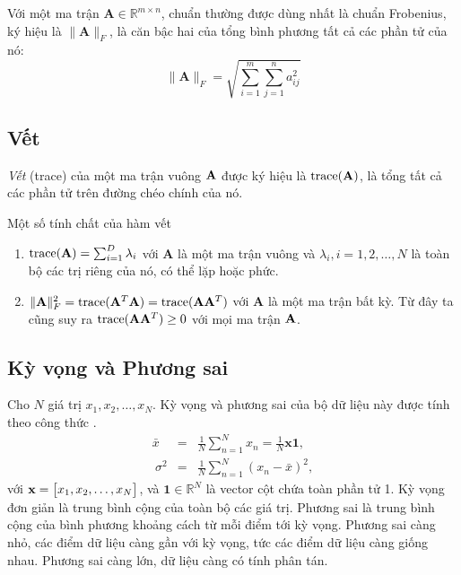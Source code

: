 Với một ma trận $\mathbf{A} \in \mathbb{R}^{m\times n}$, chuẩn thường được dùng
nhất là chuẩn Frobenius, ký hiệu là $\|\mathbf{A}\|_F$, là căn bậc hai của tổng
bình phương tất cả các phần tử của nó:
\begin{equation*}
\|\mathbf{A}\|_F = \sqrt{\sum_{i = 1}^m \sum_{j = 1}^n a_{ij}^2}
\end{equation*}
\subsection{Vết}
\textit{Vết} (trace) của một ma trận vuông $\mathbf{A}$ được ký hiệu là $\text{trace}(\mathbf{A})$, là tổng
tất cả các phần tử trên đường chéo chính của nó.

 Một số tính chất của hàm vết
\begin{enumerate}

	\item $\text{trace}(\mathbf{A}) = \sum_{i = 1}^D \lambda_i $ với
	$\mathbf{A}$ là một ma trận vuông và $\lambda_i, i = 1, 2, \dots, N$ là toàn
	bộ các trị riêng của nó, có thể lặp hoặc phức. 

	\item $\|\mathbf{A}\|_F^2 = \text{trace}(\mathbf{A}^T\mathbf{A}) =
	\text{trace}(\mathbf{A}\mathbf{A}^T)$ với $\mathbf{A}$ là một ma trận bất kỳ. Từ
	đây ta cũng suy ra $\text{trace}(\mathbf{A}\mathbf{A}^T) \geq 0$ với mọi ma trận $\mathbf{A}$.
	
\end{enumerate}
\subsection{Kỳ vọng và Phương sai} %

Cho $N$ giá trị $x_1, x_2, \dots, x_N$. {Kỳ vọng} và {phương sai}
của bộ dữ liệu này được tính theo công thức \cite{V1}.
\begin{eqnarray}
\bar{x} &=& \frac{1}{N}\sum_{n=1}^N x_n = \frac{1}{N}\mathbf{x1},\\\
\sigma^2 &=& \frac{1}{N} \sum_{n=1}^N (x_n - \bar{x})^2,
\end{eqnarray}
với $\mathbf{x} = \left[\begin{matrix} x_1, x_2, \dots, x_N\end{matrix}\right] $, và $\mathbf{1} \in \mathbb{R}^N$ là
vector cột chứa toàn phần tử 1. Kỳ vọng đơn giản là trung bình cộng của toàn bộ
các giá trị. Phương sai là trung bình cộng của bình phương khoảng cách từ mỗi
điểm tới kỳ vọng. Phương sai càng nhỏ, các điểm dữ liệu càng gần với kỳ vọng,
tức các điểm dữ liệu càng giống nhau. Phương sai càng lớn, dữ liệu càng có tính
phân tán.


